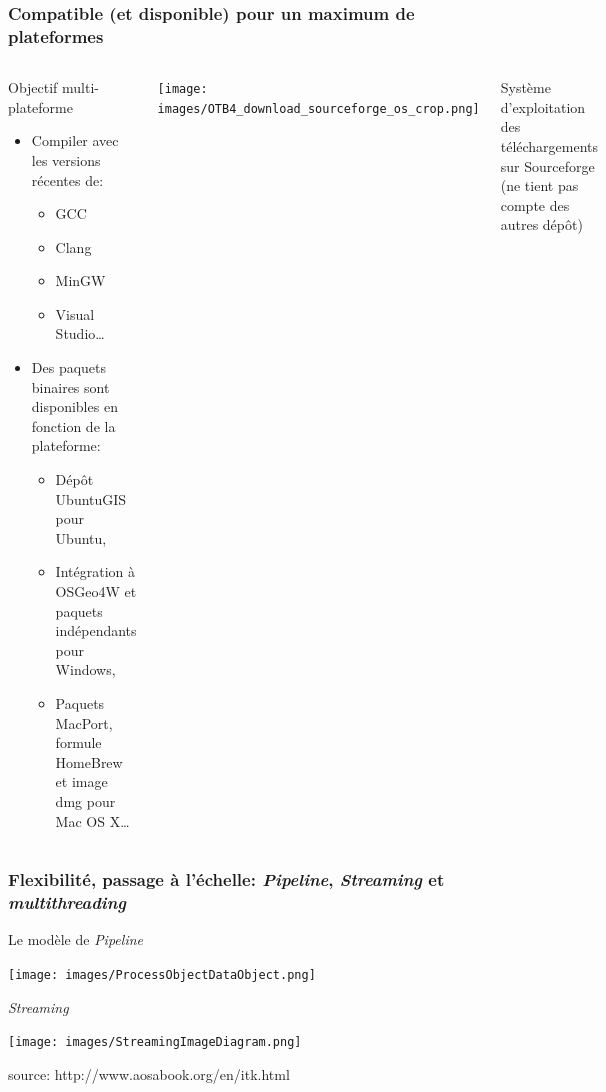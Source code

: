 \documentclass[8pt]{beamer}
\begin{document}
\begin{frame}
\frametitle{Compatible (et disponible) pour un maximum de plateformes}
\begin{columns}
\begin{block}{Objectif multi-plateforme}
\begin{itemize}
\item Compiler avec les versions récentes de:
\begin{itemize}
\item GCC
\item Clang
\item MinGW
\item Visual Studio\ldots
\end{itemize}
\item Des paquets binaires sont disponibles en fonction de la plateforme:
\begin{itemize}
\item Dépôt UbuntuGIS pour Ubuntu,
\item Intégration à OSGeo4W et paquets indépendants pour Windows,
\item Paquets MacPort, formule HomeBrew et image dmg pour Mac OS X\ldots
\end{itemize}
\end{itemize}
\end{block}
\texttt{[image: images/OTB4\_download\_sourceforge\_os\_crop.png]}
\begin{center}
\tiny{Système d'exploitation des téléchargements sur Sourceforge (ne tient pas compte des autres dépôt)}
\end{center}
\end{columns}
\end{frame}

\begin{frame}
\frametitle{Flexibilité, passage à l'échelle: \textit{Pipeline}, \textit{Streaming} et \textit{multithreading}}

\begin{block}{Le modèle de \textit{Pipeline}}
\begin{center}
\texttt{[image: images/ProcessObjectDataObject.png]}
\end{center}
\end{block}
\vspace{-0.5cm}
\begin{block}{\textit{Streaming}}
\begin{center}
\texttt{[image: images/StreamingImageDiagram.png]}
\end{center}
\end{block}
\vspace{-0.5cm}
\begin{center}
\tiny{source: http://www.aosabook.org/en/itk.html}
\end{center}
\end{frame}
\end{document}
